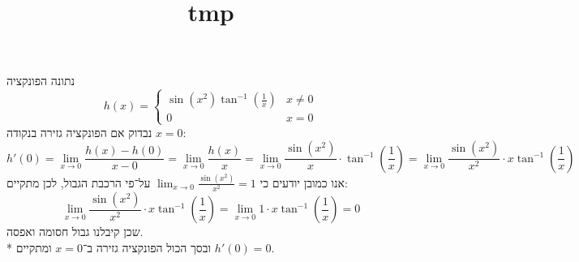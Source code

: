 
\title{tmp}



נתונה הפונקציה
\[
	h(x) = \begin{cases}
		\sin(x^2) \tan^{-1}(\frac{1}{x}) & x \ne 0 \\
		0 & x = 0
	\end{cases}
\]
נבדוק אם הפונקציה גזירה בנקודה $x = 0$:
\[
	h'(0)
	= \lim_{x \to 0} \frac{h(x) - h(0)}{x - 0}
	= \lim_{x \to 0} \frac{h(x)}{x}
	= \lim_{x \to 0} \frac{\sin(x^2)}{x} \cdot \tan^{-1}(\frac{1}{x})
	= \lim_{x \to 0} \frac{\sin(x^2)}{x^2} \cdot x \tan^{-1}(\frac{1}{x})
\]
אנו כמובן יודעים כי $\lim_{x \to 0} \frac{\sin(x^2)}{x^2} = 1$ על־פי הרכבת הגבול, לכן מתקיים:
\[
	\lim_{x \to 0} \frac{\sin(x^2)}{x^2} \cdot x \tan^{-1}(\frac{1}{x})
	= \lim_{x \to 0} 1 \cdot x \tan^{-1}(\frac{1}{x})
	= 0
\]
שכן קיבלנו גבול חסומה ואפסה. \\*
ובסך הכול הפונקציה גזירה ב־$x = 0$ ומתקיים $h'(0) = 0$.



